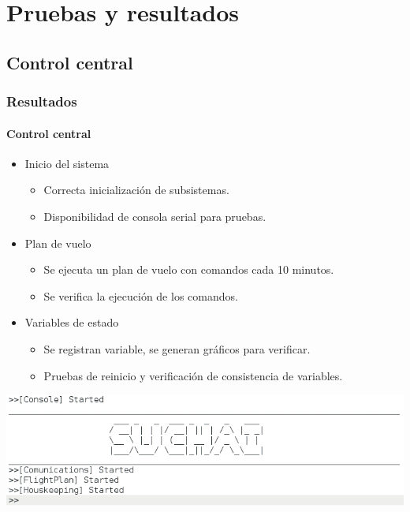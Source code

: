 \documentclass[xcolor=dvipsnames]{beamer}
\begin{document}
    \section{Pruebas y resultados}
    \subsection{Control central}
    \begin{frame}[squeeze]
        \frametitle{Resultados}
        \framesubtitle{Control central}
        
        \begin{itemize}
            \item Inicio del sistema
                \begin{itemize}
                    \item Correcta inicialización de subsistemas.
                    \item Disponibilidad de consola serial para pruebas.
                \end{itemize}
            \item Plan de vuelo
            \begin{itemize}
                \item Se ejecuta un plan de vuelo con comandos cada 10 minutos.
                \item Se verifica la ejecución de los comandos.
            \end{itemize}
            \item Variables de estado
            \begin{itemize}
                \item Se registran variable, se generan gráficos para verificar.
                \item Pruebas de reinicio y verificación de consistencia de variables.
            \end{itemize}
        \end{itemize}
        
        \begin{center}
            \includegraphics[height=0.35\textheight]{img/prompt.png}
        \end{center}

    \end{frame}
    
\end{document}
